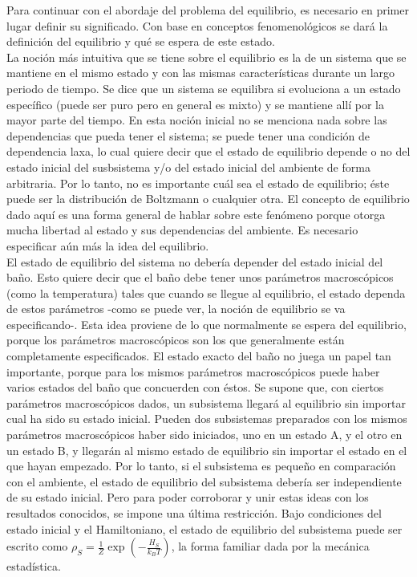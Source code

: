 Para continuar con el abordaje del problema del equilibrio, es necesario en primer lugar definir su significado. Con base en conceptos fenomenológicos se dará la  definición del equilibrio y qué se espera de este estado.
\\
La noción más intuitiva que se tiene sobre el equilibrio es la de un sistema que se mantiene en el mismo estado y con las mismas características durante un largo periodo de tiempo. Se dice que un sistema se equilibra si evoluciona a un estado específico (puede ser puro pero en general es mixto) y se mantiene allí por la mayor parte del tiempo. En esta noción inicial no se menciona nada sobre las dependencias que pueda tener el sistema; se puede tener una condición de dependencia laxa, lo cual quiere decir que el estado de equilibrio depende o no del estado inicial del susbsistema y/o del estado inicial del ambiente de forma arbitraria. Por lo tanto, no es importante cuál sea el estado de equilibrio; éste puede ser la distribución de Boltzmann o cualquier otra. El concepto de equilibrio dado aquí es una forma general de hablar sobre este fenómeno porque otorga mucha libertad al estado y sus dependencias del ambiente. Es necesario especificar aún más la idea del equilibrio.
\\
El estado de equilibrio del sistema no debería depender del estado inicial del baño. Esto quiere decir que el baño debe tener unos parámetros macroscópicos (como la temperatura) tales que cuando se llegue al equilibrio, el estado dependa de estos parámetros -como se puede ver, la noción de equilibrio se va especificando-. Esta idea proviene de lo que normalmente se espera del equilibrio, porque los parámetros macroscópicos son los que generalmente están completamente especificados. El estado exacto del baño no juega un papel tan importante, porque para los mismos parámetros macroscópicos puede haber varios estados del baño que concuerden con éstos. Se supone que, con ciertos parámetros macroscópicos dados, un subsistema llegará al equilibrio sin importar cual ha sido su estado inicial. Pueden dos subsistemas preparados con los mismos parámetros macroscópicos haber sido iniciados, uno en un estado A, y el otro en un estado B, y llegarán al mismo estado de equilibrio sin importar el estado en el que hayan empezado. Por lo tanto, si el subsistema es pequeño en comparación con el ambiente, el estado de equilibrio del subsistema debería ser independiente de su estado inicial. Pero para poder corroborar y unir estas ideas con los resultados conocidos, se impone una última restricción. Bajo condiciones del estado inicial y el Hamiltoniano, el estado de equilibrio del subsistema puede ser escrito como $\rho_{S}= \frac{1}{Z} \exp(-\frac{H_{S}}{k_{B}T})$, la forma familiar dada por la mecánica estadística.
